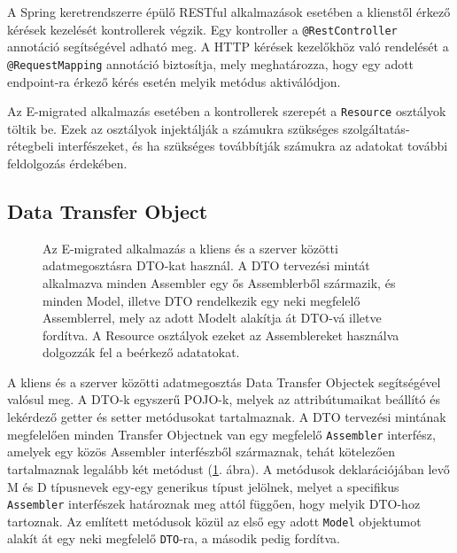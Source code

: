 A Spring keretrendszerre épülő RESTful alkalmazások esetében a klienstől érkező kérések kezelését kontrollerek végzik. Egy kontroller a \texttt{@RestController}
annotáció segítségével adható meg. A HTTP kérések kezelőkhöz való rendelését a \texttt{@RequestMapping} annotáció biztosítja, mely meghatározza, hogy egy adott endpoint-ra érkező kérés esetén melyik metódus aktiválódjon.

Az E-migrated alkalmazás esetében a kontrollerek szerepét a \texttt{Resource} osztályok töltik be. Ezek az osztályok injektálják a számukra szükséges szolgáltatás-rétegbeli interfészeket, és ha szükséges továbbítják számukra az adatokat további feldolgozás érdekében.


\begin{reviewed}
\subsection{Data Transfer Object}
\label{subsubsec:DTO}
\begin{figure}[!b]
  \centering
  \caption{Az E-migrated alkalmazás a kliens és a szerver közötti adatmegosztásra DTO-kat használ. A DTO tervezési mintát alkalmazva minden Assembler egy ős Assemblerből származik, és minden Model, illetve DTO rendelkezik egy neki megfelelő Assemblerrel, mely az adott Modelt alakítja át DTO-vá illetve fordítva. A Resource osztályok ezeket az Assemblereket használva dolgozzák fel a beérkező adatatokat. }
  \label{fig:Assembler}
\end{figure}

A kliens és a szerver közötti adatmegosztás Data Transfer Objectek segítségével valósul meg. A DTO-k egyszerű POJO-k, melyek az attribútumaikat beállító és lekérdező getter és setter metódusokat tartalmaznak. A DTO tervezési mintának \cite{DTO} megfelelően minden Transfer Objectnek van egy megfelelő \texttt{Assembler} interfész, amelyek egy közös Assembler interfészből származnak, tehát kötelezően tartalmaznak legalább két metódust (\ref{fig:Assembler}. ábra). A metódusok deklarációjában levő M és D típusnevek egy-egy generikus típust jelölnek, melyet a specifikus \texttt{Assembler} interfészek határoznak meg attól függően, hogy melyik DTO-hoz tartoznak. Az említett metódusok közül az első egy adott \texttt{Model} objektumot alakít át egy neki megfelelő \texttt{DTO}-ra, a második pedig fordítva. 


\end{reviewed}
